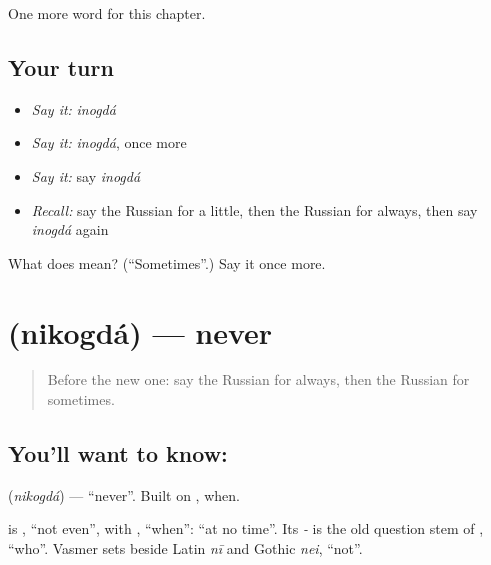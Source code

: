 \begin{grammarlens}[title={What you've built}]
One more word for this chapter.
\end{grammarlens}

\subsection*{Your turn}
\begin{itemize}
\raggedright
  \item \emph{Say it:} \emph{inogdá}
  \item \emph{Say it:} \emph{inogdá}, once more
  \item \emph{Say it:} say \emph{inogdá}
  \item \emph{Recall:} say the Russian for a little, then the Russian for always, then say \emph{inogdá} again
\end{itemize}

\begin{tcolorbox}[breakable,colback=teal!4,colframe=teal!35!black,title={Before you move on}]
What does  mean? (\textquotedblleft{}Sometimes\textquotedblright{}.) Say it once more.
\end{tcolorbox}
\section[\texorpdfstring{\ru{никогда} (nikogdá)}{никогда (nikogdá)}]{ (nikogdá) — never}

\label{lesson:RU-C74-never}



\begin{quote}
Before the new one: say the Russian for always, then the Russian for sometimes.
\end{quote}

\subsection*{You'll want to know: }
\textbf{} (\emph{nikogdá}) — \textquotedblleft{}never\textquotedblright{}. Built on \textbf{}, when.

\begin{cousinweb}
\textbf{} is \emph{}, \textquotedblleft{}not even\textquotedblright{}, with \emph{}, \textquotedblleft{}when\textquotedblright{}: \textquotedblleft{}at no time\textquotedblright{}. Its \emph{-} is the old question stem of \emph{}, \textquotedblleft{}who\textquotedblright{}. Vasmer sets \emph{} beside Latin \emph{nī} and Gothic \emph{nei}, \textquotedblleft{}not\textquotedblright{}.
\end{cousinweb}

